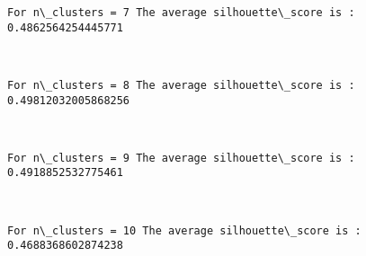 \documentclass[11pt]{article}
\begin{document}
    \begin{Verbatim}[commandchars=\\\{\}]
For n\_clusters = 7 The average silhouette\_score is : 0.4862564254445771

    \end{Verbatim}

    \begin{center}
    \end{center}
    { \hspace*{\fill} \\}
    
    \begin{Verbatim}[commandchars=\\\{\}]
For n\_clusters = 8 The average silhouette\_score is : 0.49812032005868256

    \end{Verbatim}

    \begin{center}
    \end{center}
    { \hspace*{\fill} \\}
    
    \begin{Verbatim}[commandchars=\\\{\}]
For n\_clusters = 9 The average silhouette\_score is : 0.4918852532775461

    \end{Verbatim}

    \begin{center}
    \end{center}
    { \hspace*{\fill} \\}
    
    \begin{Verbatim}[commandchars=\\\{\}]
For n\_clusters = 10 The average silhouette\_score is : 0.4688368602874238

    \end{Verbatim}

    \begin{center}
    \end{center}
    { \hspace*{\fill} \\}
    
\end{document}
